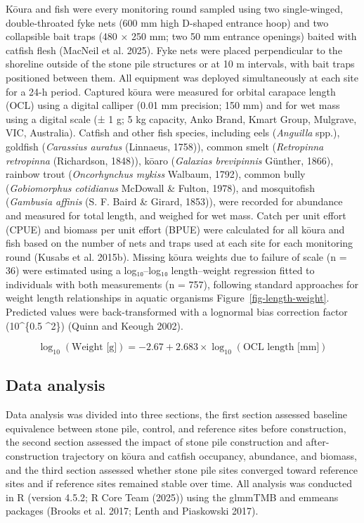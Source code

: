 \documentclass[
  12pt,
  a4paper,
  oneside]{scrbook}
\begin{document}
Kōura and fish were every monitoring round sampled using two
single-winged, double-throated fyke nets (600 mm high D-shaped entrance
hoop) and two collapsible bait traps (480 × 250 mm; two 50 mm entrance
openings) baited with catfish flesh (MacNeil et al. 2025). Fyke nets
were placed perpendicular to the shoreline outside of the stone pile
structures or at 10 m intervals, with bait traps positioned between
them. All equipment was deployed simultaneously at each site for a 24-h
period. Captured kōura were measured for orbital carapace length (OCL)
using a digital calliper (0.01 mm precision; 150 mm) and for wet mass
using a digital scale (± 1 g; 5 kg capacity, Anko Brand, Kmart Group,
Mulgrave, VIC, Australia). Catfish and other fish species, including
eels (\emph{Anguilla} spp.), goldfish (\emph{Carassius auratus}
(Linnaeus, 1758)), common smelt (\emph{Retropinna retropinna}
(Richardson, 1848)), kōaro (\emph{Galaxias brevipinnis} Günther, 1866),
rainbow trout (\emph{Oncorhynchus mykiss} Walbaum, 1792), common bully
(\emph{Gobiomorphus cotidianus} McDowall \& Fulton, 1978), and
mosquitofish (\emph{Gambusia affinis} (S. F. Baird \& Girard, 1853)),
were recorded for abundance and measured for total length, and weighed
for wet mass. Catch per unit effort (CPUE) and biomass per unit effort
(BPUE) were calculated for all kōura and fish based on the number of
nets and traps used at each site for each monitoring round (Kusabs et
al. 2015b). Missing kōura weights due to failure of scale (n = 36) were
estimated using a log₁₀--log₁₀ length--weight regression fitted to
individuals with both measurements (n = 757), following standard
approaches for weight length relationships in aquatic organisms
Figure~\ref{fig-length-weight}. Predicted values were back-transformed
with a lognormal bias correction factor (10\^{}\{0.5
\cdot \sigma\^{}2\}) (Quinn and Keough 2002).

\[
\log_{10}(\text{Weight [g]}) = -2.67 + 2.683 \times \log_{10}(\text{OCL length [mm]})
\]

\subsection{Data analysis}\label{data-analysis-2}

Data analysis was divided into three sections, the first section
assessed baseline equivalence between stone pile, control, and reference
sites before construction, the second section assessed the impact of
stone pile construction and after-construction trajectory on kōura and
catfish occupancy, abundance, and biomass, and the third section
assessed whether stone pile sites converged toward reference sites and
if reference sites remained stable over time. All analysis was conducted
in R (version 4.5.2; R Core Team (2025)) using the glmmTMB and emmeans
packages (Brooks et al. 2017; Lenth and Piaskowski 2017).
\end{document}

